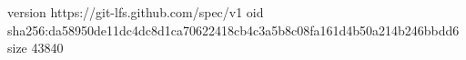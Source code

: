 version https://git-lfs.github.com/spec/v1
oid sha256:da58950de11dc4dc8d1ca70622418cb4c3a5b8c08fa161d4b50a214b246bbdd6
size 43840
